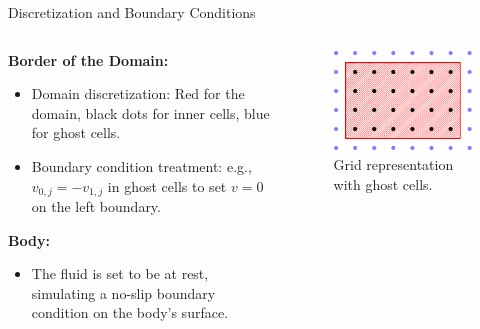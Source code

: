 \begin{frame}{Discretization and Boundary Conditions}

\begin{columns}
    \begin{column}{0.5\textwidth}
        \textbf{Border of the Domain:}
        \begin{itemize}
            \item Domain discretization: Red for the domain, black dots for inner cells, blue for ghost cells.
            \item Boundary condition treatment: e.g., \(v_{0,j} = -v_{1,j}\) in ghost cells to set $v = 0$ on the left boundary.
        \end{itemize}

        \vspace{0.5cm}
        \textbf{Body:}
        \begin{itemize}
            \item The fluid is set to be at rest, simulating a no-slip boundary condition on the body's surface.
        \end{itemize}
    \end{column}
    \begin{column}{0.5\textwidth}
        \begin{figure}
            \centering
            \includegraphics[width=0.7\linewidth]{graphics/grid.pdf}
            \caption{Grid representation with ghost cells.}
        \end{figure}
    \end{column}
\end{columns}

\end{frame}

